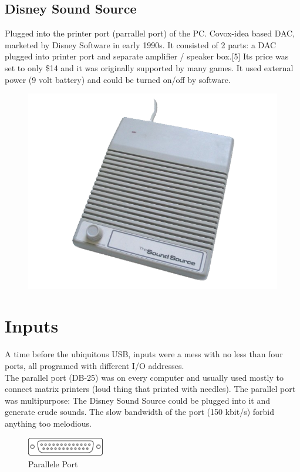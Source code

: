 \documentclass[book.tex]{subfiles}
\begin{document}
  \subsection{Disney Sound Source}
  Plugged into the printer port (parrallel port) of the PC. Covox-idea based DAC, marketed by Disney Software in early 1990s. It consisted of 2 parts: a DAC plugged into printer port and separate amplifier / speaker box.[5] Its price was set to only \$14 and it was originally supported by many games. It used external power (9 volt battery) and could be turned on/off by software.\\
  \par
  \begin{figure}[H] \centering \includegraphics[width=\textwidth]{screenshots/hardware/ss.png} \end{figure}








\section{Inputs}
A time before the ubiquitous USB, inputs were a mess with no less than four ports, all programed with different I/O addresses.\\

The parallel port (DB-25) was on every computer and usually used mostly to connect matrix printers (loud thing that printed with needles). The parallel port was multipurpose: The Disney Sound Source could be plugged into it and generate crude sounds. The slow bandwidth of the port (150 kbit/s) forbid anything too melodious.\\
 \begin{figure}[H]
\centering
\includegraphics[width=0.3\textwidth]{imgs/drawings/ports/DB-25_parallel_port.eps}
\caption{Parallele Port}
\label{fig:parallelPort}
\end{figure}
\end{document}
